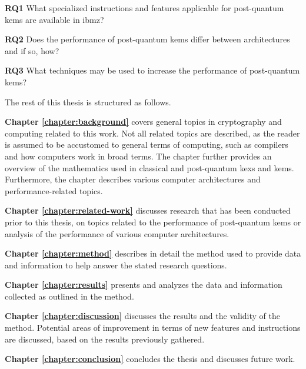 \begin{description}
    \item \textbf{RQ1} What specialized instructions and features applicable for \gls{post-quantum} \acrlong{kem}s are available in \gls{ibmz}?\label{rq1}
    
    \item \textbf{RQ2} Does the performance of \gls{post-quantum} \acrlong{kem}s differ between architectures and if so, how?\label{rq2}
    
    \item \textbf{RQ3} What techniques may be used to increase the performance of \gls{post-quantum} \acrlong{kem}s?\label{rq3}
\end{description}

\clearpage
\noindent The rest of this thesis is structured as follows.

\begin{description}
    \item \textbf{Chapter \ref{chapter:background}} covers general topics in cryptography and computing related to this work. Not all related topics are described, as the reader is assumed to be accustomed to general terms of computing, such as compilers and how computers work in broad terms. The chapter further provides an overview of the mathematics used in classical and \gls{post-quantum} \glspl{kex} and \glspl{kem}. Furthermore, the chapter describes various computer architectures and performance-related topics.

    \item \textbf{Chapter \ref{chapter:related-work}} discusses research that has been conducted prior to this thesis, on topics related to the performance of \gls{post-quantum} \glspl{kem} or analysis of the performance of various computer architectures.
    
    \item \textbf{Chapter \ref{chapter:method}} describes in detail the method used to provide data and information to help answer the stated research questions.
    
    \item \textbf{Chapter \ref{chapter:results}} presents and analyzes the data and information collected as outlined in the method.
    
    \item \textbf{Chapter \ref{chapter:discussion}} discusses the results and the validity of the method. Potential areas of improvement in terms of new features and instructions are discussed, based on the results previously gathered.
    
    \item \textbf{Chapter \ref{chapter:conclusion}} concludes the thesis and discusses future work.
\end{description}